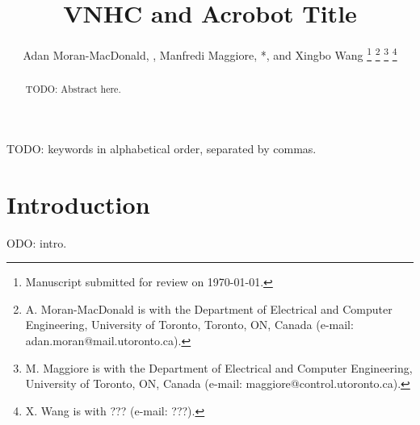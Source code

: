 \documentclass[journal,twoside,web]{ieeecolor}
\newcommand*{\Title}{VNHC and Acrobot Title}
\begin{document}
\title{\Title}
\author{Adan Moran-MacDonald, , Manfredi Maggiore,
*, and Xingbo Wang
\thanks{Manuscript submitted for review on \today.}
\thanks{A. Moran-MacDonald is with the Department of Electrical and Computer
    Engineering, University of Toronto, Toronto, ON, Canada (e-mail:
adan.moran@mail.utoronto.ca).}
\thanks{M. Maggiore is with the Department of Electrical and Computer
Engineering, University of Toronto, ON, Canada (e-mail:
maggiore@control.utoronto.ca).}
\thanks{X. Wang is with ??? (e-mail: ???).}
} %

\maketitle

\begin{abstract}
TODO: Abstract here.
\end{abstract}

\begin{IEEEkeywords}
TODO: keywords in alphabetical order, separated by commas.
\end{IEEEkeywords}

\section{Introduction}\label{sec:introduction}
ODO: intro.
\end{document}
